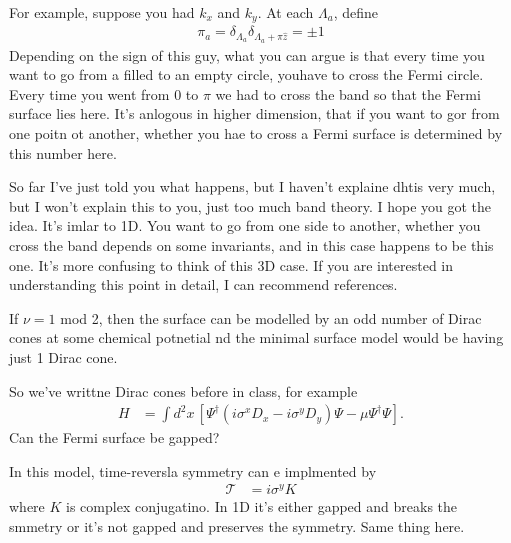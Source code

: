 For example, suppose you had $k_x$ and $k_y$.
At each $\Lambda_a$, define
\begin{align}
    \pi_a = \delta_{\Lambda_a} \delta_{\Lambda_a + \pi \hat{z}} = \pm 1
\end{align}
Depending on the sign of this guy,
what you can argue is that every time you want to go from a filled to an empty
circle,
youhave to cross the Fermi circle.
Every time you went from 0 to $\pi$ we had to cross the band so that the Fermi
surface lies here.
It's anlogous in higher dimension,
that if you want to gor from one poitn ot another,
whether you hae to cross a Fermi surface is determined by this number here.

So far I've just told you what happens,
but I haven't explaine dhtis very much,
but I won't explain this to you,
just too much band theory.
I hope you got the idea.
It's imlar to 1D.
You want to go from one side to another,
whether you cross the band depends on some invariants,
and in this case happens to be this one.
It's more confusing to think of this 3D case.
If you are interested in understanding this point in detail,
I can recommend references.

If $\nu=1$ mod 2,
then the surface can be modelled by an odd number of Dirac cones at some
chemical potnetial nd the minimal surface model would be having just 1 Dirac
cone.

So we've writtne Dirac cones before in class, for example
\begin{align}
    H &=
    \int d^2x\,
    \left[
    \Psi^\dagger\left( 
        i\sigma^x D_x - i\sigma^y D_y
    \right)\Psi
    - \mu \Psi^\dagger \Psi
    \right].
\end{align}
Can the Fermi surface be gapped?

In this model,
time-reversla symmetry can e implmented by
\begin{align}
    \mathcal{T} &= i\sigma^y K
\end{align}
where $K$ is complex conjugatino.
In 1D it's either gapped and breaks the smmetry
or it's not gapped and preserves the symmetry.
Same thing here.

